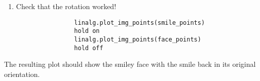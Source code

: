 \documentclass{ximera}
\begin{document}
\begin{exploration}
\begin{example}
\begin{enumerate}
\begin{verbatim}
            \end{verbatim}

            \item Check that the rotation worked!
            
            \begin{verbatim}
                linalg.plot_img_points(smile_points)
                hold on
                linalg.plot_img_points(face_points)
                hold off
            \end{verbatim}

        \end{enumerate}

        The resulting plot should show the smiley face with the smile back in its original orientation.

    \end{example}

\end{exploration}
\end{document}
